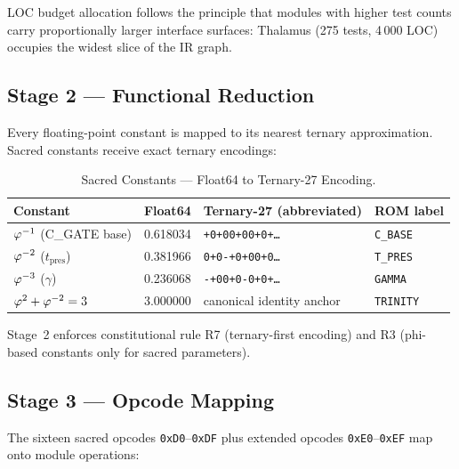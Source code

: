 LOC budget allocation follows the principle that modules with higher test counts
carry proportionally larger interface surfaces: Thalamus (275 tests,
4\,000 LOC) occupies the widest slice of the IR graph.

\subsection{Stage 2 — Functional Reduction}
\label{ssec:flos73-stage2}

Every floating-point constant is mapped to its nearest ternary approximation.
Sacred constants receive exact ternary encodings:

\begin{table}[htbp]
\centering
\caption{Sacred Constants — Float64 to Ternary-27 Encoding.}
\label{tab:flos73-constants}
\begin{tabular}{llll}
\toprule
Constant & Float64 & Ternary-27 (abbreviated) & ROM label \\
\midrule
$\varphi^{-1}$ (C\_GATE base)   & 0.618034 & \texttt{+0+00+00+0+…} & \texttt{C\_BASE} \\
$\varphi^{-2}$ ($t_{\text{pres}}$) & 0.381966 & \texttt{0+0-+0+00+0…} & \texttt{T\_PRES} \\
$\varphi^{-3}$ ($\gamma$)    & 0.236068 & \texttt{-+00+0-0+0+…} & \texttt{GAMMA}  \\
$\varphi^{2}+\varphi^{-2}=3$                 & 3.000000 & canonical identity anchor & \texttt{TRINITY} \\
\bottomrule
\end{tabular}
\end{table}

Stage~2 enforces constitutional rule R7 (ternary-first encoding) and R3
(phi-based constants only for sacred parameters).

\subsection{Stage 3 — Opcode Mapping}
\label{ssec:flos73-stage3}

The sixteen sacred opcodes \texttt{0xD0}–\texttt{0xDF} plus extended opcodes
\texttt{0xE0}–\texttt{0xEF} map onto module operations:

